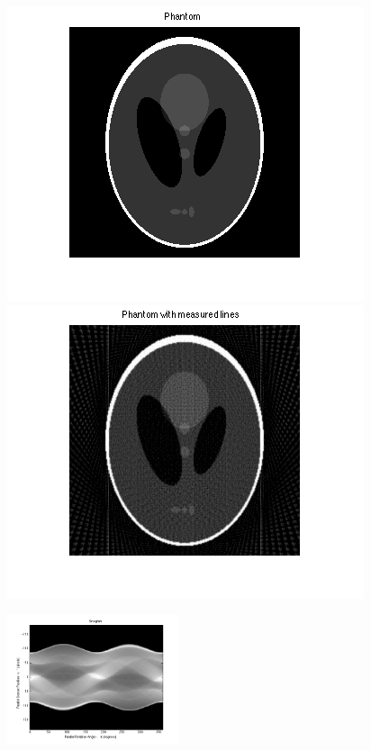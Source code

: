 \begin{frame}
\begin{figure}[!tbp]
  \centering
  \begin{minipage}[b]{0.45\textwidth}
    \includegraphics[width=\textwidth]{../phantom.png}
  \end{minipage}
	\pause
  \hfill
  \begin{minipage}[b]{0.45\textwidth}
    \includegraphics[width=\textwidth]{../phantom_measured.png}
  \end{minipage}
\end{figure}
\pause
\begin{figure}[!tbp]
\includegraphics[width=0.45\textwidth]{../sinogram.png}
\end{figure}
\end{frame}

